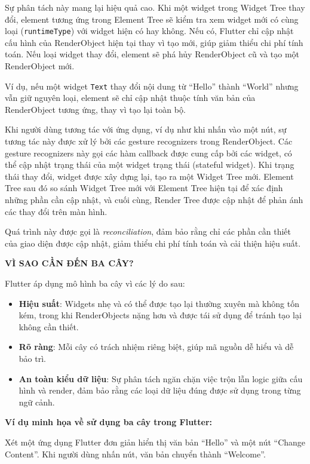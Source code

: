 \documentclass[../DoAn.tex]{subfiles}
\numberwithin{figure}{chapter}
\begin{document}
Sự phân tách này mang lại hiệu quả cao. Khi một widget trong Widget Tree thay đổi, element tương ứng trong Element Tree sẽ kiểm tra xem widget mới có cùng loại (\texttt{runtimeType}) với widget hiện có hay không. Nếu có, Flutter chỉ cập nhật cấu hình của RenderObject hiện tại thay vì tạo mới, giúp giảm thiểu chi phí tính toán. Nếu loại widget thay đổi, element sẽ phá hủy RenderObject cũ và tạo một RenderObject mới. 

Ví dụ, nếu một widget \texttt{Text} thay đổi nội dung từ ``Hello'' thành ``World'' nhưng vẫn giữ nguyên loại, element sẽ chỉ cập nhật thuộc tính văn bản của RenderObject tương ứng, thay vì tạo lại toàn bộ.

Khi người dùng tương tác với ứng dụng, ví dụ như khi nhấn vào một nút, sự tương tác này được xử lý bởi các gesture recognizers trong RenderObject. Các gesture recognizers này gọi các hàm callback được cung cấp bởi các widget, có thể cập nhật trạng thái của một widget trạng thái (stateful widget). Khi trạng thái thay đổi, widget được xây dựng lại, tạo ra một Widget Tree mới. Element Tree sau đó so sánh Widget Tree mới với Element Tree hiện tại để xác định những phần cần cập nhật, và cuối cùng, Render Tree được cập nhật để phản ánh các thay đổi trên màn hình.

Quá trình này được gọi là \textit{reconciliation}, đảm bảo rằng chỉ các phần cần thiết của giao diện được cập nhật, giảm thiểu chi phí tính toán và cải thiện hiệu suất.

\textbf{VÌ SAO CẦN ĐẾN BA CÂY?}

Flutter áp dụng mô hình ba cây vì các lý do sau:
\begin{itemize}
    \item \textbf{Hiệu suất}: Widgets nhẹ và có thể được tạo lại thường xuyên mà không tốn kém, trong khi RenderObjects nặng hơn và được tái sử dụng để tránh tạo lại không cần thiết.
    \item \textbf{Rõ ràng}: Mỗi cây có trách nhiệm riêng biệt, giúp mã nguồn dễ hiểu và dễ bảo trì. 
    \item \textbf{An toàn kiểu dữ liệu}: Sự phân tách ngăn chặn việc trộn lẫn logic giữa cấu hình và render, đảm bảo rằng các loại dữ liệu đúng được sử dụng trong từng ngữ cảnh.
\end{itemize}

\textbf{Ví dụ minh họa về sử dụng ba cây trong Flutter:}

Xét một ứng dụng Flutter đơn giản hiển thị văn bản ``Hello'' và một nút ``Change Content''. Khi người dùng nhấn nút, văn bản chuyển thành ``Welcome''.
\end{document}
